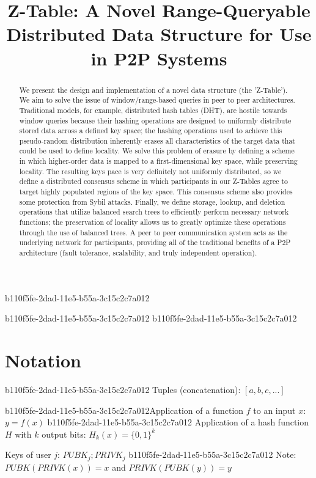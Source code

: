 \documentclass[12pt]{article}
\title{Z-Table: A Novel Range-Queryable Distributed Data Structure for Use in P2P Systems}
\begin{document}
b110f5fe-2dad-11e5-b55a-3c15c2c7a012
\maketitle
b110f5fe-2dad-11e5-b55a-3c15c2c7a012
b110f5fe-2dad-11e5-b55a-3c15c2c7a012\begin{abstract}
We present the design and implementation of a novel data structure (the 'Z-Table'). We aim to solve the issue of window/range-based queries in peer to peer architectures. Traditional models, for example,  distributed hash tables (DHT), are hostile towards window queries because their hashing operations are designed to uniformly distribute stored data across a defined key space; the hashing operations used to achieve this pseudo-random distribution inherently erases all characteristics of the target data that could be used to define locality. We solve this problem of erasure by defining a scheme in which higher-order data is mapped to a first-dimensional key space, while preserving locality. The resulting keys pace is very definitely not uniformly distributed, so we define a distributed consensus scheme in which participants in our Z-Tables agree to target highly populated regions of the key space. This consensus scheme also provides some protection from Sybil attacks. Finally, we define storage, lookup, and deletion operations that utilize balanced search trees to efficiently perform necessary network functions; the preservation of locality allows us to greatly optimize these operations through the use of balanced trees. A peer to peer communication system acts as the underlying network for participants, providing all of the traditional benefits of a P2P architecture (fault tolerance, scalability, and truly independent operation).
\end{abstract}

\section{Notation}
b110f5fe-2dad-11e5-b55a-3c15c2c7a012
Tuples (concatenation): $[a,b,c,...]$

b110f5fe-2dad-11e5-b55a-3c15c2c7a012Application of a function $f$ to an input $x$: $y=f(x)$
b110f5fe-2dad-11e5-b55a-3c15c2c7a012
Application of a hash function $H$ with $k$ output bits: $H_{k}(x) = \{0,1\}^k$

Keys of user $j$: $ PUBK_j; PRIVK_j $
b110f5fe-2dad-11e5-b55a-3c15c2c7a012
Note: $PUBK(PRIVK(x)) = x$ and $PRIVK(PUBK(y)) = y$~
\end{document}
